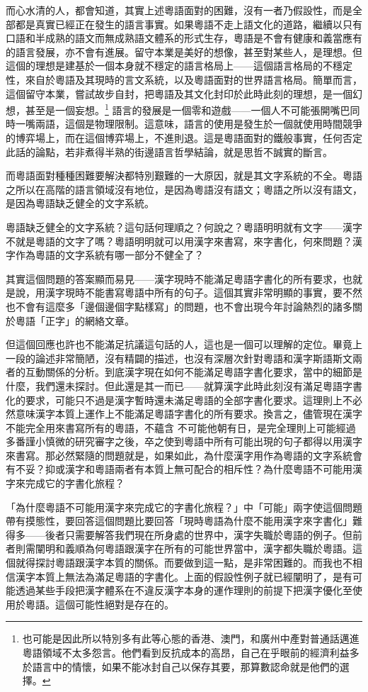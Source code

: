 \documentclass[a5paper, 12pt, openany]{book} %
\begin{document}
而心水清的人，都會知道，其實上述粵語面對的困難，沒有一者乃假設性，而是全部都是真實已經正在發生的語言事實。如果粵語不走上語文化的道路，繼續以只有口語和半成熟的語文而無成熟語文體系的形式生存，粵語是不會有健康和義當應有的語言發展，亦不會有進展。留守本業是美好的想像，甚至對某些人，是理想。但這個的理想是建基於一個本身就不穩定的語言格局上——這個語言格局的不穩定性，來自於粵語及其現時的言文系統，以及粵語面對的世界語言格局。簡單而言，這個留守本業，嘗試故步自封，把粵語及其文化封印於此時此刻的理想，是一個幻想，甚至是一個妄想。\footnote{也可能是因此所以特別多有此等心態的香港、澳門，和廣州中產對普通話邁進粵語領域不太多怨言。他們看到反抗成本的高昂，自己在乎眼前的經濟利益多於語言中的情懷，如果不能冰封自己以保存其要，那算數認命就是他們的選擇。} 語言的發展是一個零和遊戲——一個人不可能張開嘴巴同時一嘴兩語，這個是物理限制。這意味，語言的使用是發生於一個就使用時間競爭的博弈場上，而在這個博弈場上，不進則退。這是粵語面對的鐵般事實，任何否定此話的論點，若非煮得半熟的街邊語言哲學結論，就是思哲不誠實的斷言。

而粵語面對種種困難要解決都特別艱難的一大原因，就是其文字系統的不全。粵語之所以在高階的語言領域沒有地位，是因為粵語沒有語文；粵語之所以沒有語文，是因為粵語缺乏健全的文字系統。

粵語缺乏健全的文字系統？這句話何理順之？何說之？粵語明明就有文字——漢字不就是粵語的文字了嗎？粵語明明就可以用漢字來書寫，來字書化，何來問題？漢字作為粵語的文字系統有哪一部分不健全了？

其實這個問題的答案顯而易見——漢字現時不能滿足粵語字書化的所有要求，也就是說，用漢字現時不能書寫粵語中所有的句子。這個其實非常明顯的事實，要不然也不會有這麼多「邊個邊個字點樣寫」的問題，也不會出現今年討論熱烈的諸多關於粵語「正字」的網絡文章。

但這個回應也許也不能滿足抗議這句話的人，這也是一個可以理解的定位。畢竟上一段的論述非常簡陋，沒有精闢的描述，也沒有深層次針對粵語和漢字斯語斯文兩者的互動關係的分析。到底漢字現在如何不能滿足粵語字書化要求，當中的細節是什麼，我們還未探討。但此還是其一而已——就算漢字此時此刻沒有滿足粵語字書化的要求，可能只不過是漢字暫時還未滿足粵語的全部字書化要求。這理則上不必然意味漢字本質上運作上不能滿足粵語字書化的所有要求。換言之，儘管現在漢字不能完全用來書寫所有的粵語，不蘊含 不可能他朝有日，是完全理則上可能經過多番謹小慎微的研究審字之後，卒之使到粵語中所有可能出現的句子都得以用漢字來書寫。那必然緊隨的問題就是，如果如此，為什麼漢字用作為粵語的文字系統會有不妥？抑或漢字和粵語兩者有本質上無可配合的相斥性？為什麼粵語不可能用漢字來完成它的字書化旅程？

「為什麼粵語不可能用漢字來完成它的字書化旅程？」中「可能」兩字使這個問題帶有摸態性，要回答這個問題比要回答「現時粵語為什麼不能用漢字來字書化」難得多——後者只需要解答我們現在所身處的世界中，漢字失職於粵語的例子。但前者則需闡明和義順為何粵語跟漢字在所有的可能世界當中，漢字都失職於粵語。這個就得探討粵語跟漢字本質的關係。而要做到這一點，是非常困難的。而我也不相信漢字本質上無法為滿足粵語的字書化。上面的假設性例子就已經闡明了，是有可能透過某些手段把漢字體系在不違反漢字本身的運作理則的前提下把漢字優化至使用於粵語。這個可能性絕對是存在的。
\end{document}
